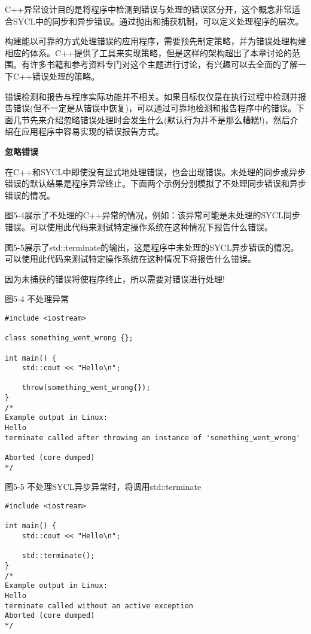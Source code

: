 C++异常设计目的是将程序中检测到错误与处理的错误区分开，这个概念非常适合SYCL中的同步和异步错误。通过抛出和捕获机制，可以定义处理程序的层次。\par

构建能以可靠的方式处理错误的应用程序，需要预先制定策略，并为错误处理构建相应的体系。C++提供了工具来实现策略，但是这样的架构超出了本章讨论的范围。有许多书籍和参考资料专门对这个主题进行讨论，有兴趣可以去全面的了解一下C++错误处理的策略。\par

错误检测和报告与程序实际功能并不相关。如果目标仅仅是在执行过程中检测并报告错误(但不一定是从错误中恢复)，可以通过可靠地检测和报告程序中的错误。下面几节先来介绍忽略错误处理时会发生什么(默认行为并不是那么糟糕!)，然后介绍在应用程序中容易实现的错误报告方式。\par

\hspace*{\fill} \par %
\textbf{忽略错误}

在C++和SYCL中即使没有显式地处理错误，也会出现错误。未处理的同步或异步错误的默认结果是程序异常终止。下面两个示例分别模拟了不处理同步错误和异步错误的情况。\par

图5-4展示了不处理的C++异常的情况，例如：该异常可能是未处理的SYCL同步错误。可以使用此代码来测试特定操作系统在这种情况下报告什么错误。\par

图5-5展示了std::terminate的输出，这是程序中未处理的SYCL异步错误的情况。可以使用此代码来测试特定操作系统在这种情况下将报告什么错误。\par

因为未捕获的错误将使程序终止，所以需要对错误进行处理!\par

\hspace*{\fill} \par %
图5-4 不处理异常
\begin{lstlisting}[caption={}]
#include <iostream>

class something_went_wrong {};

int main() {
	std::cout << "Hello\n";
	
	throw(something_went_wrong{});
}
/*
Example output in Linux:
Hello
terminate called after throwing an instance of 'something_went_wrong'

Aborted (core dumped)
*/
\end{lstlisting}

\hspace*{\fill} \par %
图5-5 不处理SYCL异步异常时，将调用std::terminate
\begin{lstlisting}[caption={}]
#include <iostream>

int main() {
	std::cout << "Hello\n";
	
	std::terminate();
}
/*
Example output in Linux:
Hello
terminate called without an active exception
Aborted (core dumped)
*/
\end{lstlisting}

